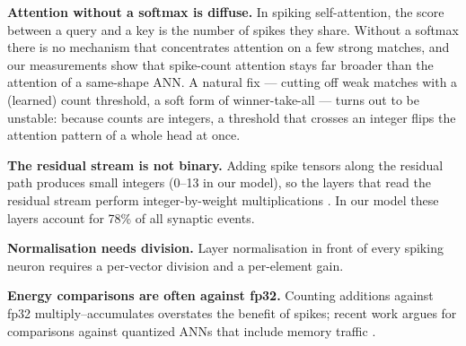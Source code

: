 \documentclass[10pt]{article}
\begin{document}
\textbf{Attention without a softmax is diffuse.} In spiking self-attention, the score between a query and a key is
the number of spikes they share. Without a softmax there is no mechanism that concentrates attention on a few
strong matches, and our measurements show that spike-count attention stays far broader than the attention of a
same-shape ANN. A natural fix --- cutting off weak matches with a (learned) count threshold, a soft form of
winner-take-all --- turns out to be unstable: because counts are integers, a threshold that crosses an integer
flips the attention pattern of a whole head at once.

\textbf{The residual stream is not binary.} Adding spike tensors along the residual path produces small integers
(0--13 in our model), so the layers that read the residual stream perform integer-by-weight multiplications
\citep{zhou2023spikingformer, yao2023spikedriven}. In our model these layers account for 78\% of all synaptic
events.

\textbf{Normalisation needs division.} Layer normalisation in front of every spiking neuron requires a per-vector
division and a per-element gain.

\textbf{Energy comparisons are often against fp32.} Counting additions against fp32 multiply--accumulates
overstates the benefit of spikes; recent work argues for comparisons against quantized ANNs that include memory
traffic \citep{yan2024reconsidering, shen2024efficient}.
\end{document}
